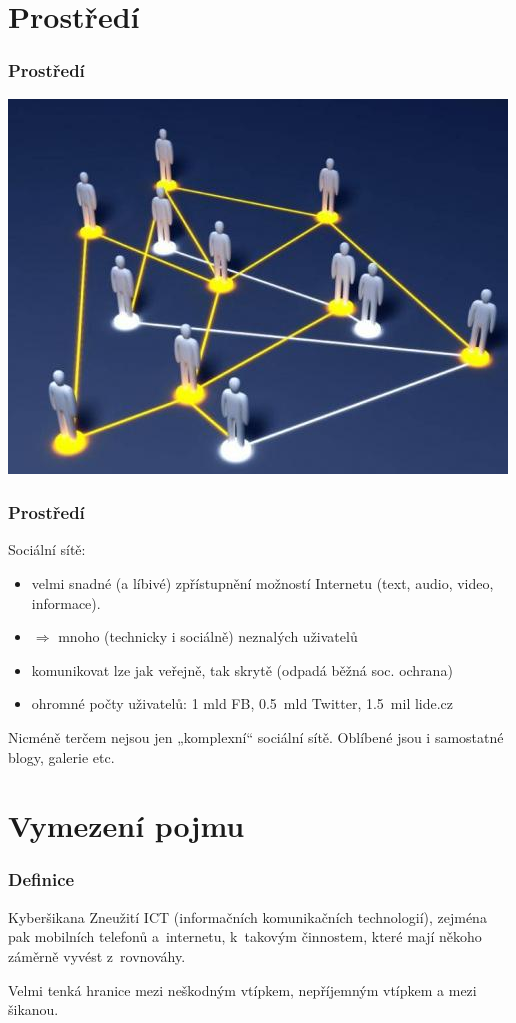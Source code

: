 \documentclass[xetex]{beamer}
\begin{document}
\section{Prostředí}
\begin{frame}
	\frametitle{Prostředí}
	
	\includegraphics[scale=0.5]{soc.sites.jpg}
\end{frame}
\begin{frame}
	\frametitle{Prostředí}
	
	Sociální sítě: 
		\begin{itemize}
			\item velmi snadné (a líbivé) zpřístupnění možností Internetu (text, audio, video, informace).
			\item $\Rightarrow$ mnoho (technicky i sociálně) neznalých uživatelů
			\item komunikovat lze jak veřejně, tak skrytě (odpadá běžná soc. ochrana)
			\item ohromné počty uživatelů: 1 mld FB, 0.5~mld Twitter, 1.5~mil lide.cz
		\end{itemize}
		
	Nicméně terčem nejsou jen „komplexní“ sociální sítě. Oblíbené jsou i samostatné blogy, galerie etc.
\end{frame}

\section{Vymezení pojmu}
\begin{frame}
 \frametitle{Definice}
	\begin{block}{Kyberšikana}
	 Zneužití ICT (informačních komunikačních technologií), zejména pak mobilních telefonů a~internetu, k~takovým činnostem, které mají někoho záměrně vyvést z~rovnováhy.
	\end{block}

	\bigskip	

	Velmi tenká hranice mezi neškodným vtípkem, nepříjemným vtípkem a mezi šikanou.
\end{frame}
\end{document}
